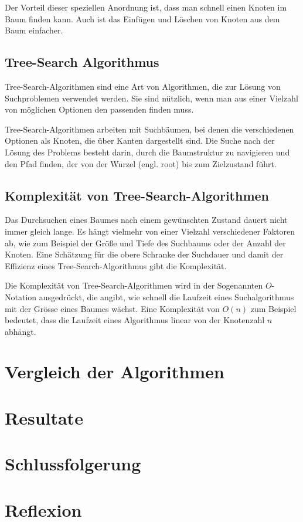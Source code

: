 \documentclass[a4paper,11pt]{article}
\begin{document}
Der Vorteil dieser speziellen Anordnung ist, dass man schnell einen Knoten im Baum finden kann. Auch ist das Einfügen und Löschen von Knoten aus dem Baum einfacher.

\subsection{Tree-Search Algorithmus}
Tree-Search-Algorithmen sind eine Art von Algorithmen, die zur Lösung von Suchproblemen verwendet werden. Sie sind nützlich, wenn man aus einer Vielzahl von möglichen Optionen den passenden finden muss.

Tree-Search-Algorithmen arbeiten mit Suchbäumen, bei denen die verschiedenen Optionen als Knoten, die über Kanten dargestellt sind. Die Suche nach der Lösung des Problems besteht darin, durch die Baumstruktur zu navigieren und den Pfad finden, der von der Wurzel (engl. root) bis zum Zielzustand führt.

\subsection{Komplexität von Tree-Search-Algorithmen}
Das Durchsuchen eines Baumes nach einem gewünschten Zustand dauert nicht immer gleich lange. Es hängt vielmehr von einer Vielzahl verschiedener Faktoren ab, wie zum Beispiel der Größe und Tiefe des Suchbaums oder der Anzahl der Knoten. Eine Schätzung für die obere Schranke der Suchdauer und damit der Effizienz eines Tree-Search-Algorithmus gibt die Komplexität. 

Die Komplexität von Tree-Search-Algorithmen wird in der Sogenannten $O$-Notation ausgedrückt, die angibt, wie schnell die Laufzeit eines Suchalgorithmus mit der Grösse eines Baumes wächst. Eine Komplexität von $O(n)$ zum Beispiel bedeutet, dass die Laufzeit eines Algorithmus linear von der Knotenzahl $n$ abhängt.

\section{Vergleich der Algorithmen}

\section{Resultate}
\section{Schlussfolgerung}
\section{Reflexion}

\pagebreak


\end{document}
